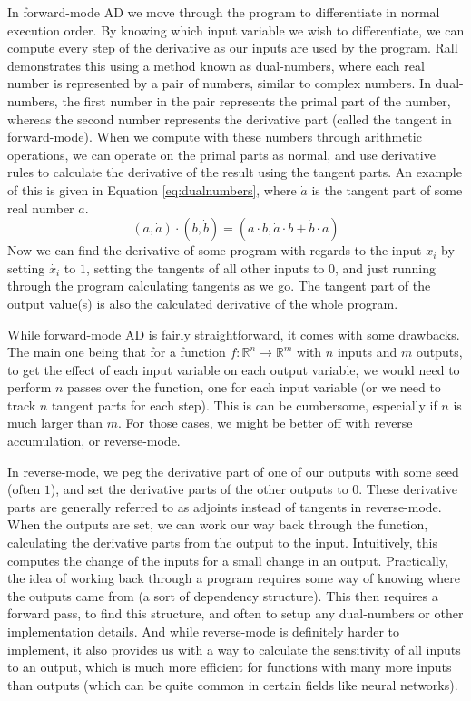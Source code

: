         In forward-mode AD we move through the program to differentiate in normal execution order.
        By knowing which input variable we wish to differentiate, we can compute every step of the derivative as our inputs are used by the program.
        Rall demonstrates this using a method known as dual-numbers, where each real number is represented by a pair of numbers, similar to complex numbers.
        In dual-numbers, the first number in the pair represents the primal part of the number, whereas the second number represents the derivative part (called the tangent in forward-mode).
        When we compute with these numbers through arithmetic operations, we can operate on the primal parts as normal, and use derivative rules to calculate the derivative of the result using the tangent parts.
        An example of this is given in Equation \ref{eq:dualnumbers}, where $\dot{a}$ is the tangent part of some real number $a$.
        \begin{equation} \label{eq:dualnumbers}
            (a,\dot{a})\cdot(b,\dot{b})=(a\cdot b, \dot{a}\cdot b+\dot{b}\cdot a)
        \end{equation}
        Now we can find the derivative of some program with regards to the input $x_i$ by setting $\dot{x_i}$ to $1$, setting the tangents of all other inputs to $0$, and just running through the program calculating tangents as we go.
        The tangent part of the output value(s) is also the calculated derivative of the whole program.

        While forward-mode AD is fairly straightforward, it comes with some drawbacks.
        The main one being that for a function $f:\mathbb{R}^n\to\mathbb{R}^m$ with $n$ inputs and $m$ outputs, to get the effect of each input variable on each output variable, we would need to perform $n$ passes over the function, one for each input variable (or we need to track $n$ tangent parts for each step).
        This is can be cumbersome, especially if $n$ is much larger than $m$.
        For those cases, we might be better off with reverse accumulation, or reverse-mode.

        In reverse-mode, we peg the derivative part of one of our outputs with some seed (often $1$), and set the derivative parts of the other outputs to $0$.
        These derivative parts are generally referred to as adjoints instead of tangents in reverse-mode.
        When the outputs are set, we can work our way back through the function, calculating the derivative parts from the output to the input.
        Intuitively, this computes the change of the inputs for a small change in an output.
        Practically, the idea of working back through a program requires some way of knowing where the outputs came from (a sort of dependency structure).
        This then requires a forward pass, to find this structure, and often to setup any dual-numbers or other implementation details.
        And while reverse-mode is definitely harder to implement, it also provides us with a way to calculate the sensitivity of all inputs to an output, which is much more efficient for functions with many more inputs than outputs (which can be quite common in certain fields like neural networks).

